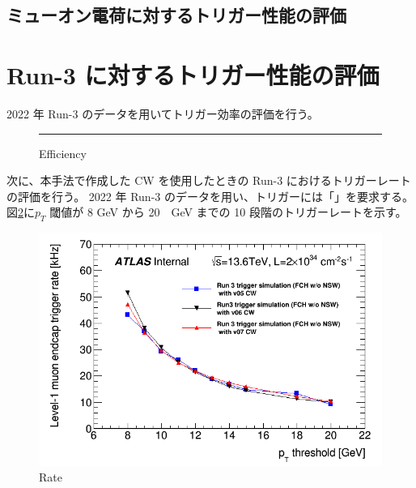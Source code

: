 \subsection{ミューオン電荷に対するトリガー性能の評価}

\section{Run-3 に対するトリガー性能の評価}
2022 年 Run-3 のデータを用いてトリガー効率の評価を行う。
\begin{figure}[tb]
  \centering
  \rule{8cm}{6cm}
  \caption{Efficiency}
  \label{fig:fit_def}
\end{figure}

次に、本手法で作成した CW を使用したときの Run-3 におけるトリガーレートの評価を行う。
2022 年 Run-3 のデータを用い、トリガーには「」を要求する。
図\ref{fig:Run-3_rate}に$p_T$ 閾値が 8 GeV から 20　GeV までの 10 段階のトリガーレートを示す。
\begin{figure}[tb]
  \centering
  \includegraphics[clip, width=14cm]{fig/5/l1mue_rate_run3.png}
  \caption{Rate}
  \label{fig:Run-3_rate}
\end{figure}










